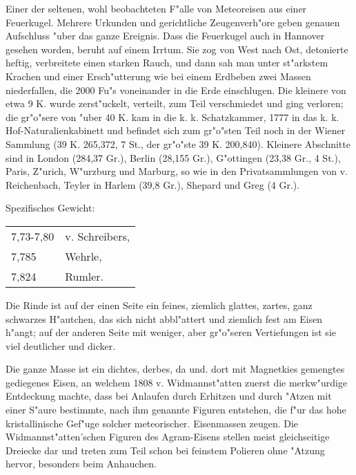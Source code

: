 \documentclass[a4paper, 11pt, oneside]{article}
\begin{document}
Einer der seltenen, wohl beobachteten F"alle von Meteoreisen aus einer Feuerkugel. Mehrere Urkunden und gerichtliche Zeugenverh"ore geben genauen Aufschluss "uber das ganze Ereignis. Dass die Feuerkugel auch in Hannover gesehen worden, beruht auf einem Irrtum. Sie zog von West nach Ost, detonierte heftig, verbreitete einen starken Rauch, und dann sah man unter st"arkstem Krachen und einer Ersch"utterung wie bei einem Erdbeben zwei Massen niederfallen, die 2000 Fu"s voneinander in die Erde einschlugen. Die kleinere von etwa 9 K. wurde zerst"uckelt, verteilt, zum Teil verschmiedet und ging verloren; die gr"o"sere von "uber 40 K. kam in die k. k. Schatzkammer, 1777 in das k. k. Hof-Naturalienkabinett und befindet sich zum gr"o"sten Teil noch in der Wiener Sammlung (39 K. 265,372, 7 St., der gr"o"ste 39 K. 200,840). Kleinere Abschnitte sind in London (284,37 Gr.), Berlin (28,155 Gr.), G"ottingen (23,38 Gr., 4 St.), Paris, Z"urich, W"urzburg und Marburg, so wie in den Privatsammlungen von v. Reichenbach, Teyler in Harlem (39,8 Gr.), Shepard und Greg (4 Gr.).

Spezifisches Gewicht:  
\begin{table}[!ht]
    \centering
    \begin{tabular}{l l}
        7,73-7,80 & v. Schreibers,\\
        7,785 & Wehrle,\\
        7,824 & Rumler.
    \end{tabular}
\end{table}

Die Rinde ist auf der einen Seite ein feines, ziemlich glattes, zartes, ganz schwarzes H"autchen, das sich nicht abbl"attert und ziemlich fest am Eisen h"angt; auf der anderen Seite mit weniger, aber gr"o"seren Vertiefungen ist sie viel deutlicher und dicker.

Die ganze Masse ist ein dichtes, derbes, da und. dort mit Magnetkies gemengtes gediegenes Eisen, an welchem 1808 v. Widmannst"atten zuerst die merkw"urdige Entdeckung machte, dass bei Anlaufen durch Erhitzen und durch "Atzen mit einer S"aure bestimmte, nach ihm genannte Figuren entstehen, die f"ur das hohe kristallinische Gef"uge solcher meteorischer. Eisenmassen zeugen. Die Widmannst"atten'schen Figuren des Agram-Eisens stellen meist gleichseitige Dreiecke dar und treten zum Teil schon bei feinstem Polieren ohne "Atzung hervor, besonders beim Anhauchen.
\end{document}

